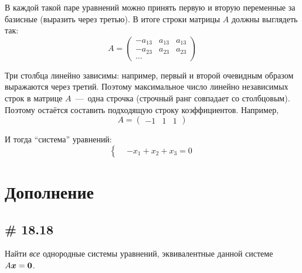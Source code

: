 \documentclass[a4paper,12pt]{article}
\begin{document}
\begin{solution}
    В каждой такой паре уравнений можно принять первую и вторую переменные за базисные (выразить через третью).
    В итоге строки матрицы $A$ должны выглядеть так:
    \[
      A = \begin{pmatrix}
        -a_{13} & a_{13} & a_{13}\\
        -a_{23} & a_{23} & a_{23}\\
        \ldots
      \end{pmatrix}
    \]
    
    Три столбца линейно зависимы: например, первый и второй очевидным образом выражаются через третий.
    Поэтому максимальное число линейно независимых строк в матрице $A$~---~одна строчка (строчный ранг совпадает со столбцовым).
    Поэтому остаётся составить подходящую строку коэффициентов.
    Например,
    \[
      A = \begin{pmatrix}
        -1 & 1 & 1
      \end{pmatrix}
    \]
    
    И тогда ``система'' уравнений:
    \[
      \left\{
        \begin{aligned}
          &-x_1 + x_2 + x_3 = 0
        \end{aligned}
      \right.
    \]
  \end{solution}
  
  
  \section{Дополнение}
  \subsection{\# 18.18}
  \label{sec:18-18}
  
  Найти \emph{все} однородные системы уравнений, эквивалентные данной системе $A \bds x \hm= \bds 0$.
  
\end{document}
